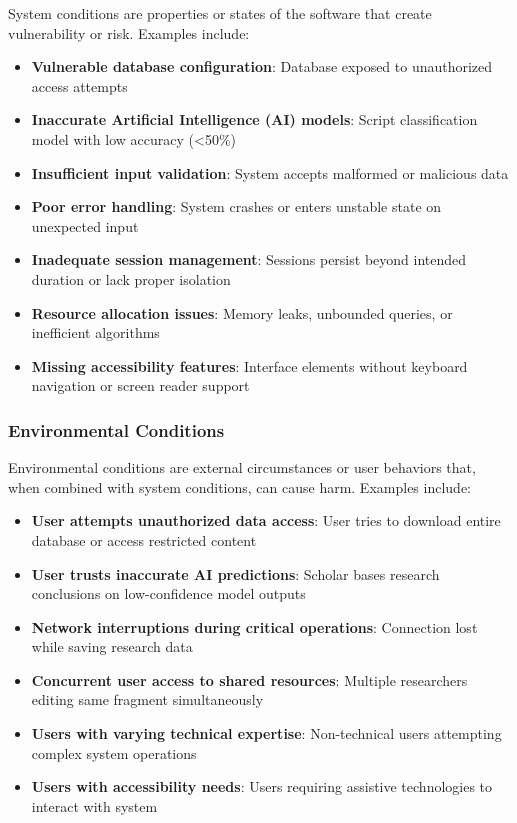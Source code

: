 \documentclass{article}
\begin{document}
System conditions are properties or states of the software that create vulnerability or risk. Examples include:

\begin{itemize}
\item \textbf{Vulnerable database configuration}: Database exposed to unauthorized access attempts
\item \textbf{Inaccurate Artificial Intelligence (AI) models}: Script classification model with low accuracy (<50\%)
\item \textbf{Insufficient input validation}: System accepts malformed or malicious data
\item \textbf{Poor error handling}: System crashes or enters unstable state on unexpected input
\item \textbf{Inadequate session management}: Sessions persist beyond intended duration or lack proper isolation
\item \textbf{Resource allocation issues}: Memory leaks, unbounded queries, or inefficient algorithms
\item \textbf{Missing accessibility features}: Interface elements without keyboard navigation or screen reader support
\end{itemize}

\subsubsection{Environmental Conditions}

Environmental conditions are external circumstances or user behaviors that, when combined with system conditions, can cause harm. Examples include:

\begin{itemize}
\item \textbf{User attempts unauthorized data access}: User tries to download entire database or access restricted content
\item \textbf{User trusts inaccurate AI predictions}: Scholar bases research conclusions on low-confidence model outputs
\item \textbf{Network interruptions during critical operations}: Connection lost while saving research data
\item \textbf{Concurrent user access to shared resources}: Multiple researchers editing same fragment simultaneously
\item \textbf{Users with varying technical expertise}: Non-technical users attempting complex system operations
\item \textbf{Users with accessibility needs}: Users requiring assistive technologies to interact with system
\end{itemize}
\end{document}
